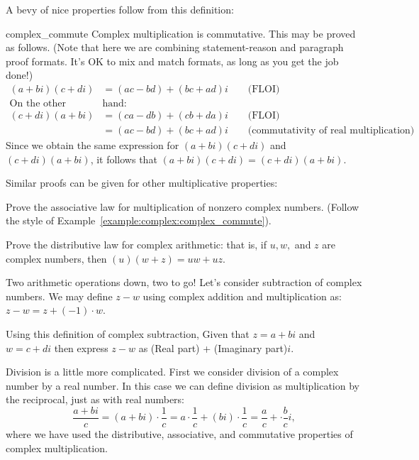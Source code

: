 A bevy of nice properties follow from this definition:

\begin{example}{complex_commute}
Complex multiplication is commutative.  This may be proved as follows. (Note that here we are combining statement-reason and paragraph proof formats.  It's OK to mix and match formats, as long as you get the job done!) 
\begin{align*}
(a + bi)(c + di) &= (ac - bd) + (bc + ad)i \qquad \text{(FLOI)}\\
\text{On the other }&\text{hand:}\\
(c + di)(a + bi) &= (ca - db) + (cb + da)i \qquad \text{(FLOI)}\\
& = (ac - bd) + (bc + ad)i \qquad \text{(commutativity of real multiplication)}
\end{align*}
Since we obtain the same expression for $(a + bi)(c + di)$ and $(c + di)(a + bi)$, it follows that 
$(a + bi)(c + di) = (c + di)(a + bi)$.
\end{example}

Similar proofs can be given for other multiplicative properties:

\begin{exercise}{16}
Prove the associative law for multiplication of nonzero complex numbers. (Follow the style of Example~\ref{example:complex:complex_commute}).
\end{exercise}

\begin{exercise}{17}
Prove the distributive law for complex arithmetic: that is, if $u,w,$ and $z$ are complex numbers, then $(u)(w+z) = uw + uz$.
\end{exercise}

Two arithmetic operations down, two to go!  Let's consider subtraction of complex numbers. We may define $z - w$ using complex addition and multiplication as:  $z - w = z + (-1)\cdot w$.

\begin{exercise}{}
Using this definition of complex subtraction, Given that  $z = a + bi$ and $w = c + di$ then express $z - w$ as (Real part)  + (Imaginary part)$i$.
\end{exercise}

Division is a little more complicated. First we consider division of a complex number by a real number.  In this case we can define division as multiplication by the reciprocal, just as with real numbers:
\begin{equation*}\label{eq:complex:1}
\frac{a + bi}{c} = (a + bi) \cdot \frac{1}{c} = a \cdot \frac{1}{c} + (bi) \cdot \frac{1}{c} = \frac{a}{c} + \cdot \frac{b}{c}i , 
\end{equation*}
where we have used the distributive, associative, and commutative properties of complex multiplication. 

